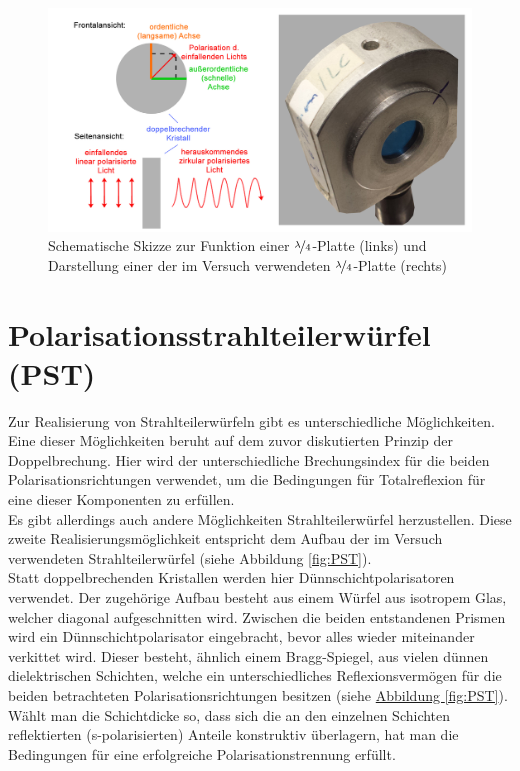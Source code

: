 \documentclass[
class=book,
accentcolor=1b,
custommargins=geometry,
fontsize=11pt,
thesis={type=Versuchsanleitung},
ruledheaders=all,
headline=false,
instbox=false,
marginpar=false,
title=small,
ignore-missing-data=true,
twoside=false,
logofile=apqdesign/tuda_logo.pdf,
pdfa=false %
]{apqpub}
\newtheorem{frage}[satz]{Frage}
\begin{document}
\\
	\begin{figure}[htb!]
			\centering
			\includegraphics[width=\textwidth]{graphics/LVPT.jpg}
			\caption{Schematische Skizze zur Funktion einer $\nicefrac{\lambda}{4}$-Platte (links)
				und Darstellung einer der im Versuch verwendeten $\nicefrac{\lambda}{4}$-Platte (rechts)}
			\label{fig:LVPT}
		\end{figure}
		
		\section{Polarisationsstrahlteilerwürfel (PST)}	
		Zur Realisierung von Strahlteilerwürfeln gibt es unterschiedliche Möglichkeiten. Eine dieser Möglichkeiten beruht auf dem zuvor diskutierten Prinzip der Doppelbrechung. Hier wird der unterschiedliche Brechungsindex für die beiden Polarisationsrichtungen verwendet, um die Bedingungen für Totalreflexion für eine dieser Komponenten zu erfüllen.\\
		Es gibt allerdings auch andere Möglichkeiten Strahlteilerwürfel herzustellen. Diese zweite Realisierungsmöglichkeit entspricht dem Aufbau der im Versuch verwendeten Strahlteilerwürfel (siehe Abbildung \ref{fig:PST}).\\ 
		Statt doppelbrechenden Kristallen werden hier Dünnschichtpolarisatoren verwendet. 
		Der zugehörige Aufbau besteht aus einem Würfel aus isotropem Glas, welcher diagonal aufgeschnitten wird. Zwischen die beiden entstandenen Prismen wird ein Dünnschichtpolarisator eingebracht, bevor alles wieder miteinander verkittet wird. Dieser besteht, ähnlich einem Bragg-Spiegel, aus vielen dünnen dielektrischen Schichten, welche ein unterschiedliches Reflexionsvermögen für die beiden betrachteten Polarisationsrichtungen besitzen (siehe \hyperref[fig:PST]{Abbildung \ref{fig:PST}}). 
		Wählt man die Schichtdicke so, dass sich die an den einzelnen Schichten reflektierten (s-polarisierten) Anteile konstruktiv überlagern, hat man die Bedingungen für eine erfolgreiche Polarisationstrennung erfüllt.\cite{EX}
\vspace{7pt}
		
\end{document}
